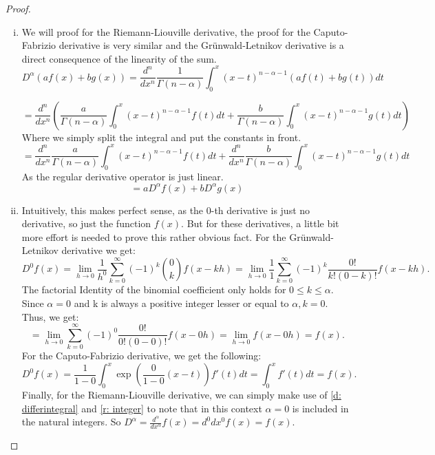 \begin{proof}
    \begin{enumerate}[(i)]
        \item We will proof for the Riemann-Liouville derivative, the proof for the Caputo-Fabrizio derivative is very similar and the Grünwald-Letnikov derivative is a direct consequence of the linearity of the sum.
        \[ D^{\alpha} (a f(x) + b g(x)) = \frac{d^n}{dx^n}\frac{1}{\Gamma(n - \alpha)} \int_{0}^{x} (x - t)^{n - \alpha - 1} (a f(t) + b g(t)) dt \]
     
        \[= \frac{d^n}{dx^n}(\frac{a}{\Gamma(n - \alpha)} \int_{0}^{x} (x - t)^{n - \alpha - 1}  f(t)dt + \frac{b}{\Gamma(n - \alpha)} \int_{0}^{x} (x - t)^{n - \alpha - 1} g(t)dt) \] Where we simply split the integral and put the constants in front.
        \[= \frac{d^n}{dx^n}\frac{a}{\Gamma(n - \alpha)} \int_{0}^{x} (x - t)^{n - \alpha - 1}  f(t)dt + \frac{d^n}{dx^n} \frac{b}{\Gamma(n - \alpha)} \int_{0}^{x} (x - t)^{n - \alpha - 1} g(t)dt \] As the regular derivative operator is just linear.
        \[ = a D^{\alpha} f(x) + b D^{\alpha} g(x) \]
        \item Intuitively, this makes perfect sense, as the 0-th derivative is just no derivative, so just the function \(f(x)\). But for these derivatives, a little bit more effort is needed to prove this rather obvious fact.
        \newline 
        For the Grünwald-Letnikov derivative we get: \[D^0 f(x) = \lim_{h \to 0} \frac{1}{h^0} \sum_{k=0}^\infty (-1)^k \binom{0}{k} f(x - k h)
        = \lim_{h \to 0} \frac{1}{1} \sum_{k=0}^\infty (-1)^k \frac{0!}{k!(0- k)!} f(x - k h).\] The factorial Identity of the binomial coefficient only holds for \(0 \leq k \leq \alpha\). Since \(\alpha = 0\) and k is always a positive integer lesser or equal to \(\alpha, k = 0\). Thus, we get:
        \[ = \lim_{h \to 0} \sum_{k=0}^\infty (-1)^0 \frac{0!}{0!(0- 0)!} f(x - 0 h) = \lim_{h \to 0} f(x - 0 h) = f(x).\]
        \newline
        For the Caputo-Fabrizio derivative, we get the following:
        \[ D^{0} f(x) = \frac{1}{1 - 0}  \int_{0}^{x} \exp(\frac{0}{1 -0}(x-t)) f'(t) dt = \int_{0}^{x}f'(t) dt = f(x).\]
        \newline
        Finally, for the Riemann-Liouville derivative, we can simply make use of \autoref{d: differintegral} and \autoref{r: integer} to note that in this context \(\alpha = 0\) is included in the natural integers. So \(D^\alpha = \frac{d^\alpha}{dx^\alpha} f(x) = {d^0}{dx^0} f(x) = f(x)\).


\end{enumerate}
\end{proof}
